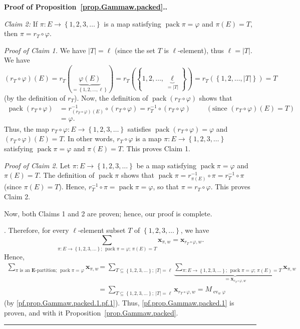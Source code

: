 \documentclass[numbers=enddot,12pt,final,onecolumn,notitlepage,abstracton]{scrartcl}
\theoremstyle{definition}
\newenvironment{proof}[1][Proof]{\noindent\textbf{#1.} }{\ \rule{0.5em}{0.5em}}
\let\sumnonlimits\sum
\renewcommand{\sum}{\sumnonlimits\limits}
\newcommand{\xx}{{\mathbf{x}}}
\newcommand{\ev}{\operatorname{ev}}
\newcommand{\pack}{\operatorname{pack}}
\newcommand{\EE}{{\mathbf{E}}}
\begin{document}
\begin{proof}[Proof of Proposition~\ref{prop.Gammaw.packed}.]
{\textit{Claim 2:} If $\pi:E\rightarrow\left\{  1,2,3,\ldots\right\}  $ is a
map satisfying $ \pack \pi=\varphi$ and $\pi\left(  E\right)  =T$,
then $\pi=r_{T}\circ\varphi$.

\textit{Proof of Claim 1.} We have $\left|T\right| = \ell$ (since the set
$T$ is $\ell$-element), thus $\ell = \left|T\right|$.
We have $\left(  r_{T}\circ\varphi\right)  \left(
E\right)  =r_{T}\left(  \underbrace{\varphi\left(  E\right)  }_{=\left\{
1,2,\ldots,\ell\right\}  }\right)  =r_{T}\left(  \left\{  1,2,\ldots
,\underbrace{\ell}_{=\left\vert T\right\vert }\right\}  \right)
=r_{T}\left(  \left\{
1,2,\ldots,\left\vert T\right\vert \right\}  \right)  =T$ (by the definition
of $r_{T}$). Now, the definition of $ \pack \left(  r_{T}%
\circ\varphi\right)  $ shows that
\begin{align*}
 \pack \left(  r_{T}\circ\varphi\right)   & =r_{\left(  r_{T}%
\circ\varphi\right)  \left(  E\right)  }^{-1}\circ\left(  r_{T}\circ
\varphi\right)  =r_{T}^{-1}\circ\left(  r_{T}\circ\varphi\right)
\ \ \ \ \ \ \ \ \ \ \left(  \text{since }\left(  r_{T}\circ\varphi\right)
\left(  E\right)  =T\right) \\
& =\varphi.
\end{align*}
Thus, the map $r_{T}\circ\varphi:E\rightarrow\left\{  1,2,3,\ldots\right\}  $
satisfies $ \pack \left(  r_{T}\circ\varphi\right)  =\varphi$ and
$\left(  r_{T}\circ\varphi\right)  \left(  E\right)  =T$. In other words,
$r_{T}\circ\varphi$ is a map $\pi:E\rightarrow\left\{  1,2,3,\ldots\right\}  $
satisfying $ \pack \pi=\varphi$ and $\pi\left(  E\right)  =T$.
This proves Claim 1.

\textit{Proof of Claim 2.} Let $\pi:E\rightarrow\left\{  1,2,3,\ldots\right\}
$ be a map satisfying $ \pack \pi=\varphi$ and $\pi\left(
E\right)  =T$. The definition of $ \pack \pi$ shows that
$ \pack \pi=r_{\pi\left(  E\right)  }^{-1}\circ\pi=r_{T}^{-1}%
\circ\pi$ (since $\pi\left(  E\right)  =T$). Hence, $r_{T}^{-1}\circ
\pi= \pack \pi=\varphi$, so that $\pi=r_{T}\circ\varphi$. This
proves Claim 2.

Now, both Claims 1 and 2 are proven; hence, our proof is complete.
}. Therefore, for every $\ell$-element subset $T$ of
$\left\{1, 2, 3, \ldots\right\}$, we have
\[
\sum_{\pi : E \to \left\{1, 2, 3, \ldots\right\} \text{; } \pack \pi = \varphi
\text{; } \pi\left(E\right) = T}
\xx_{\pi, w}
= \xx_{r_T\circ\varphi,w} .
\]
Hence,
\begin{align*}
\sum_{\pi\text{ is an }\EE\text{-partition; } \pack \pi = \varphi}
\xx_{\pi, w}
&= \sum_{T \subseteq \left\{1, 2, 3, \ldots\right\} ; \ \left|T\right| = \ell}
\underbrace{\sum_{\pi : E \to \left\{1, 2, 3, \ldots\right\} \text{; } \pack \pi = \varphi
\text{; } \pi\left(E\right) = T}
\xx_{\pi, w}}_{= \xx_{r_T\circ\varphi,w}} \\
&= \sum_{T \subseteq \left\{1, 2, 3, \ldots\right\} ; \ \left|T\right| = \ell}
\xx_{r_T\circ\varphi,w}
= M_{\ev_w \varphi}
\end{align*}
(by \eqref{pf.prop.Gammaw.packed.1.pf.1}).
Thus, \eqref{pf.prop.Gammaw.packed.1}
is proven, and with it Proposition~\ref{prop.Gammaw.packed}.
\end{proof}
\end{document}
